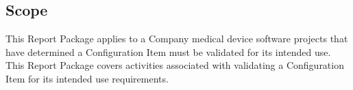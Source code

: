 \subsection{Scope}
This Report Package applies to a Company medical device software projects that
have determined a Configuration Item must be validated for its intended use.
This Report Package covers activities associated with validating a Configuration
Item for its intended use requirements.
